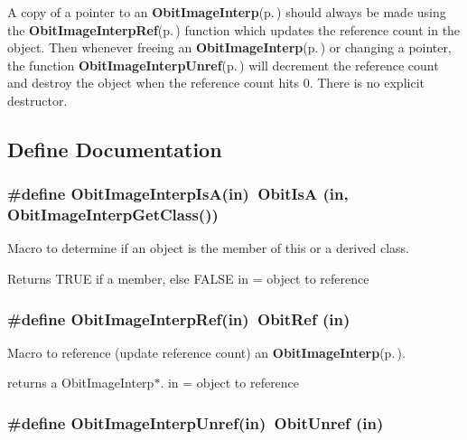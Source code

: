 A copy of a pointer to an {\bf Obit\-Image\-Interp}{\rm (p.\,\pageref{structObitImageInterp})} should always be made using the {\bf Obit\-Image\-Interp\-Ref}{\rm (p.\,\pageref{ObitImageInterp_8h_a1})} function which updates the reference count in the object. Then whenever freeing an {\bf Obit\-Image\-Interp}{\rm (p.\,\pageref{structObitImageInterp})} or changing a pointer, the function {\bf Obit\-Image\-Interp\-Unref}{\rm (p.\,\pageref{ObitImageInterp_8h_a0})} will decrement the reference count and destroy the object when the reference count hits 0. There is no explicit destructor.

\subsection{Define Documentation}
\subsubsection{\setlength{\rightskip}{0pt plus 5cm}\#define Obit\-Image\-Interp\-Is\-A(in)\ Obit\-Is\-A (in, Obit\-Image\-Interp\-Get\-Class())}\label{ObitImageInterp_8h_a2}


Macro to determine if an object is the member of this or a derived class. 

Returns TRUE if a member, else FALSE in = object to reference 
\subsubsection{\setlength{\rightskip}{0pt plus 5cm}\#define Obit\-Image\-Interp\-Ref(in)\ Obit\-Ref (in)}\label{ObitImageInterp_8h_a1}


Macro to reference (update reference count) an {\bf Obit\-Image\-Interp}{\rm (p.\,\pageref{structObitImageInterp})}. 

returns a Obit\-Image\-Interp$\ast$. in = object to reference 
\subsubsection{\setlength{\rightskip}{0pt plus 5cm}\#define Obit\-Image\-Interp\-Unref(in)\ Obit\-Unref (in)}\label{ObitImageInterp_8h_a0}


